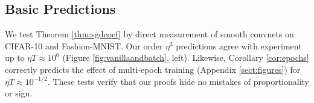 \documentclass{article}
\theoremstyle{plain}
\theoremstyle{definition}
\begin{document}

    \subsection{Basic Predictions}
        We test Theorem \ref{thm:sgdcoef} by direct measurement of smooth
        convnets on CIFAR-10 and Fashion-MNIST.  Our order $\eta^3$
        predictions agree with experiment up to $\eta T \approx 10^0$ (Figure
        \ref{fig:vanillaandbatch}, left).  Likewise, Corollary \ref{cor:epochs}
        correctly predicts the effect of multi-epoch training (Appendix
        \ref{sect:figures}) for $\eta T \approx 10^{-1/2}$.  These tests verify
        that our proofs hide no mistakes of proportionality or sign.  

\end{document}
